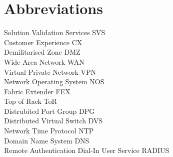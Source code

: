 \section*{Abbreviations}
\large 
Solution Validation Services \hfill SVS\\
Customer Experience \hfill CX\\
Demilitarised Zone \hfill DMZ\\
Wide Area Network \hfill WAN\\
Virtual Private Network \hfill VPN\\
Network Operating System \hfill NOS\\
Fabric Extender \hfill FEX\\
Top of Rack \hfill ToR\\
Distrubited Port Group \hfill DPG\\
Distributed Virtual Switch \hfill DVS\\
Network Time Protocol \hfill NTP\\
Domain Name System \hfill DNS\\
Remote Authentication Dial-In User Service \hfill RADIUS